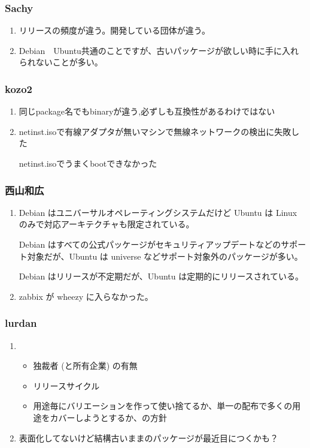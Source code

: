 \documentclass[cjk,dvipdfmx,10pt,compress,%
hyperref={bookmarks=true,bookmarksnumbered=true,bookmarksopen=false,%
colorlinks=false,%
pdftitle={第 72 回 関西 Debian 勉強会},%
pdfauthor={倉敷・のがた・佐々木・かわだ・八津尾},%
pdfsubject={資料},%
}]{beamer}
\begin{document}
\begin{frame}\frametitle{ Sachy }
  \begin{enumerate}
  \item リリースの頻度が違う。開発している団体が違う。
  \item Debian　Ubuntu共通のことですが、古いパッケージが欲しい時に手に入れられないことが多い。
  \end{enumerate}
\end{frame}

\begin{frame}\frametitle{ kozo2 }
  \begin{enumerate}
  \item 同じpackage名でもbinaryが違う,必ずしも互換性があるわけではない
  \item netinst.isoで有線アダプタが無いマシンで無線ネットワークの検出に失敗した

    netinst.isoでうまくbootできなかった
  \end{enumerate}
\end{frame}

\begin{frame}\frametitle{ 西山和広 }
  \begin{enumerate}
  \item Debian はユニバーサルオペレーティングシステムだけど Ubuntu は Linux のみで対応アーキテクチャも限定されている。

    Debian はすべての公式パッケージがセキュリティアップデートなどのサポート対象だが、Ubuntu は universe などサポート対象外のパッケージが多い。

    Debian はリリースが不定期だが、Ubuntu は定期的にリリースされている。
  \item zabbix が wheezy に入らなかった。
  \end{enumerate}
\end{frame}

\begin{frame}\frametitle{ lurdan }
  \begin{enumerate}
  \item
    \begin{itemize}
    \item 独裁者 (と所有企業) の有無
    \item リリースサイクル
    \item 用途毎にバリエーションを作って使い捨てるか、単一の配布で多くの用途をカバーしようとするか、の方針
    \end{itemize}
  \item 表面化してないけど結構古いままのパッケージが最近目につくかも？
  \end{enumerate}
\end{frame}
\end{document}

